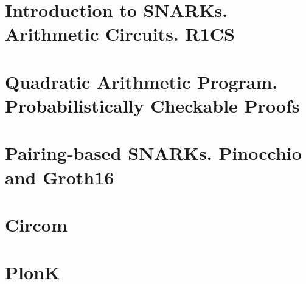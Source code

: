 \documentclass{zkdl-template}
\begin{document}


\section{Introduction to SNARKs. Arithmetic Circuits. R1CS}\label{section:r1cs}



\section{Quadratic Arithmetic Program. Probabilistically Checkable Proofs}\label{section:qap}



\section{Pairing-based SNARKs. Pinocchio and Groth16}\label{section:groth16}



\section{Circom}\label{section:circom}



\section{PlonK}\label{section:plonk}


\end{document}

